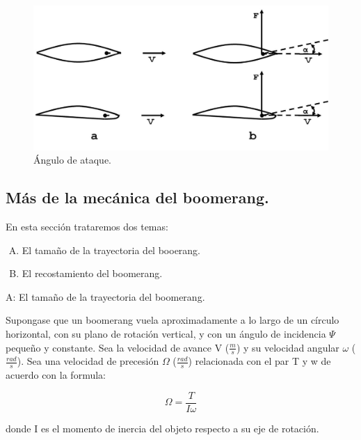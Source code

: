 		\begin{figure}[ht]
		\begin{center}
		\includegraphics[scale=0.2]{imagenes/3-boomerang/atackangle.jpg}
		\caption{Ángulo de ataque.}
		\label{fig10}
		\end{center}
		\end{figure}

		\subsection{Más de la mecánica del boomerang.}

	En esta sección trataremos dos temas:
    	\begin{enumerate}[A)]
		\item El tamaño de la trayectoria del booerang.
		\item El recostamiento del boomerang.
		\end{enumerate}

	A: El tamaño de la trayectoria del boomerang.

	Supongase que un boomerang vuela aproximadamente a lo largo de un círculo horizontal, con su plano de rotación vertical, y con un ángulo de incidencia $\Psi$ pequeño y constante. Sea la velocidad de avance V ($\frac{m}{s}$) y su velocidad angular $\omega$ ($\frac{rad}{s}$). Sea una velocidad de precesión $\Omega$ ($\frac{rad}{s}$) relacionada con el par T y w de acuerdo con la formula:

		\begin{equation}
		\Omega = \frac{T}{I\omega}
		\label{ec1}
		\end{equation}  %


	donde I es el momento de inercia del objeto respecto a su eje de rotación.

